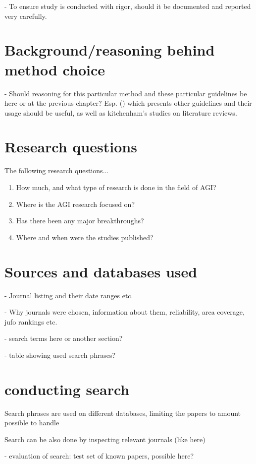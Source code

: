 \documentclass[utf8,english]{gradu3}
\begin{document}
- To ensure study is conducted with rigor, should it be documented and reported
very carefully.

\section{Background/reasoning behind method choice}

- Should reasoning for this particular method and these particular guidelines
be here or at the previous chapter? Esp. (\cite{petersen2015}) which presents
other guidelines and their usage should be useful, as well as kitchenham's 
studies on literature reviews.

\section{Research questions}

The following research questions...

\begin{enumerate}
  \item How much, and what type of research is done in the field of AGI?
  \item Where is the AGI research focused on?
  \item Has there been any major breakthroughs?
  \item Where and when were the studies published?
\end{enumerate}

\section{Sources and databases used}
- Journal listing and their date ranges etc.

- Why journals were chosen, information about them, reliability, area coverage,
jufo rankings etc.

- search terms here or another section? 

- table showing used search phrases?

\section{conducting search}
Search phrases are used on different databases, limiting the papers to amount
possible to handle

Search can be also done by inspecting relevant journals (like here)

- evaluation of search: test set of known papers, possible here?
\end{document}
